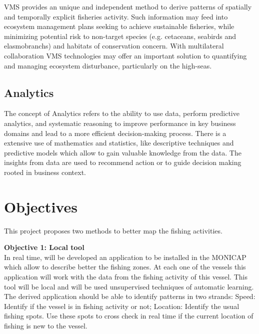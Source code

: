 VMS provides an unique and independent method to derive patterns of spatially and temporally explicit fisheries activity. Such information may feed into ecosystem management plans seeking to achieve sustainable fisheries, while minimizing potential risk to non-target species (e.g. cetaceans, seabirds and elasmobranchs) and habitats of conservation concern. With multilateral collaboration VMS technologies may offer an important solution to quantifying and managing ecosystem disturbance, particularly on the high-seas.




\subsection{Analytics} %
\label{sub:analytucs}
The concept of Analytics refers to the ability to use data, perform predictive analytics, and systematic reasoning to improve performance in key business domains and lead to a more efficient decision-making process.
There is a extensive use of mathematics and statistics, like descriptive techniques and predictive models which allow to gain valuable knowledge from the data.
The insights from data are used to recommend action or to guide decision making rooted in business context.







\section{Objectives} %
\label{sec:objectives}
This project proposes two methods to better map the fishing activities. 

 \textbf{Objective 1: Local tool} \\
In real time, will be developed an application to be installed in the MONICAP which allow to describe better the fishing zones. At each one of the vessels this application will work with the data from the fishing activity of this vessel. This tool will be local and will be used unsupervised techniques of automatic learning.
The derived application should be able to identify patterns in two strands:
Speed: Identify if the vessel is in fishing activity or not;
Location: Identify the usual fishing spots. Use these spots to cross check in real time if the current location of fishing is new to the vessel.


